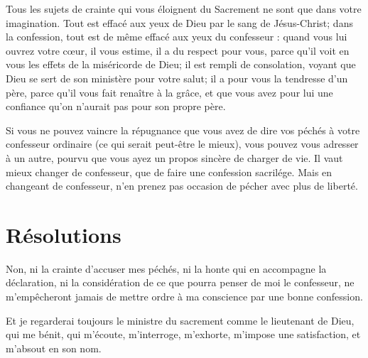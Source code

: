 \documentclass[instructions.tex]{subfiles}
\begin{document}
Tous les sujets de crainte qui vous éloignent du Sacrement ne sont que dans votre imagination. Tout est effacé aux yeux de Dieu par le sang de Jésus-Christ; dans la confession, tout est de même effacé aux yeux du confesseur : quand vous lui ouvrez votre cœur, il vous estime, il a du respect pour vous, parce qu’il voit en vous les effets de la miséricorde de Dieu; il est rempli de consolation, voyant que Dieu se sert de son ministère pour votre salut; il a pour vous la tendresse d’un père, parce qu’il vous fait renaître à la grâce, et que vous avez pour lui une confiance qu’on n’aurait pas pour son propre père.
 
Si vous ne pouvez vaincre la répugnance que vous avez de dire vos péchés à votre confesseur ordinaire (ce qui serait peut-être le mieux), vous pouvez vous adresser à un autre, pourvu que vous ayez un propos sincère de charger de vie. Il vaut mieux changer de confesseur, que de faire une confession sacrilége. Mais en changeant de confesseur, n’en prenez pas occasion de pécher avec plus de liberté.
 
\section{Résolutions}
 
\primo Non, ni la crainte d’accuser mes péchés, ni la honte qui en accompagne la déclaration, ni la considération de ce que pourra penser de moi le confesseur, ne m’empêcheront jamais de mettre ordre à ma conscience par une bonne confession.
 
\secundo Et je regarderai toujours le ministre du sacrement comme le lieutenant de Dieu, qui me bénit, qui m’écoute, m’interroge, m’exhorte, m’impose une satisfaction, et m’absout en son nom. 

 
\end{document}
